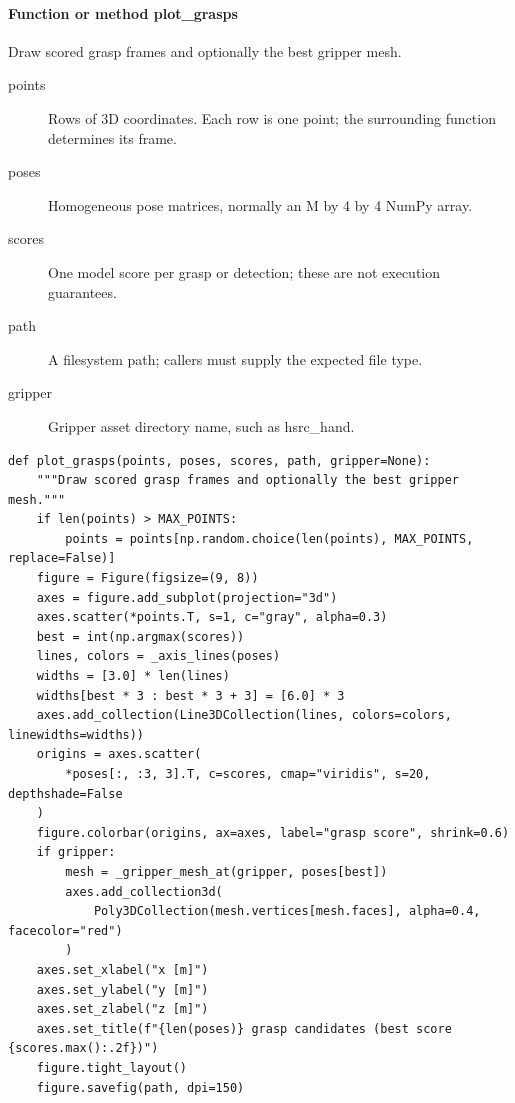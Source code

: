 \documentclass[11pt,a4paper]{book}
\begin{document}
\paragraph{Function or method plot\_grasps}
Draw scored grasp frames and optionally the best gripper mesh.

\begin{description}
\item[points] Rows of 3D coordinates. Each row is one point; the surrounding function determines its frame.
\item[poses] Homogeneous pose matrices, normally an M by 4 by 4 NumPy array.
\item[scores] One model score per grasp or detection; these are not execution guarantees.
\item[path] A filesystem path; callers must supply the expected file type.
\item[gripper] Gripper asset directory name, such as hsrc\_hand.
\end{description}

\begin{lstlisting}[firstnumber=33]
def plot_grasps(points, poses, scores, path, gripper=None):
    """Draw scored grasp frames and optionally the best gripper mesh."""
    if len(points) > MAX_POINTS:
        points = points[np.random.choice(len(points), MAX_POINTS, replace=False)]
    figure = Figure(figsize=(9, 8))
    axes = figure.add_subplot(projection="3d")
    axes.scatter(*points.T, s=1, c="gray", alpha=0.3)
    best = int(np.argmax(scores))
    lines, colors = _axis_lines(poses)
    widths = [3.0] * len(lines)
    widths[best * 3 : best * 3 + 3] = [6.0] * 3
    axes.add_collection(Line3DCollection(lines, colors=colors, linewidths=widths))
    origins = axes.scatter(
        *poses[:, :3, 3].T, c=scores, cmap="viridis", s=20, depthshade=False
    )
    figure.colorbar(origins, ax=axes, label="grasp score", shrink=0.6)
    if gripper:
        mesh = _gripper_mesh_at(gripper, poses[best])
        axes.add_collection3d(
            Poly3DCollection(mesh.vertices[mesh.faces], alpha=0.4, facecolor="red")
        )
    axes.set_xlabel("x [m]")
    axes.set_ylabel("y [m]")
    axes.set_zlabel("z [m]")
    axes.set_title(f"{len(poses)} grasp candidates (best score {scores.max():.2f})")
    figure.tight_layout()
    figure.savefig(path, dpi=150)
\end{lstlisting}
\end{document}
